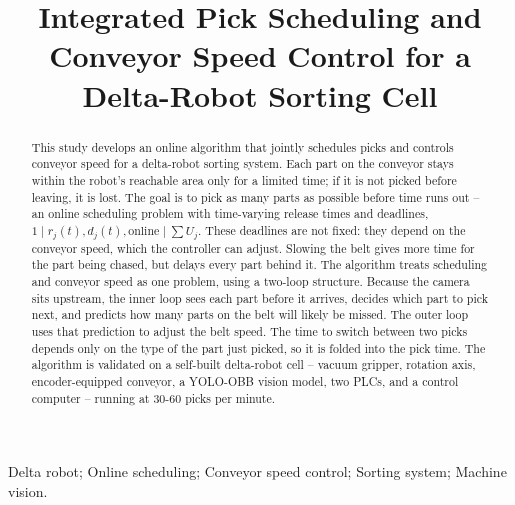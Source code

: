 \documentclass[conference,a4paper]{IEEEtran}
\begin{document}
\title{Integrated Pick Scheduling and Conveyor Speed Control for a
Delta-Robot Sorting Cell}

\author{
}

\maketitle

\begin{abstract}
This study develops an online algorithm that jointly schedules picks and
controls conveyor speed for a delta-robot sorting system. Each part on the
conveyor stays within the robot's reachable area only for a limited time; if
it is not picked before leaving, it is lost. The goal is to pick as many
parts as possible before time runs out -- an online scheduling problem with
time-varying release times and deadlines, $1 \mid r_j(t), d_j(t),
\text{online} \mid \sum U_j$. These deadlines are not fixed: they depend on
the conveyor speed, which the controller can adjust. Slowing the belt gives
more time for the part being chased, but delays every part behind it. The
algorithm treats scheduling and conveyor speed as one problem, using a
two-loop structure. Because the camera sits upstream, the inner loop sees
each part before it arrives, decides which part to pick next, and predicts
how many parts on the belt will likely be missed. The outer loop uses that
prediction to adjust the belt speed. The time to switch between two picks
depends only on the type of the part just picked, so it is folded into the
pick time. The algorithm is validated on a self-built delta-robot cell --
vacuum gripper, rotation axis, encoder-equipped conveyor, a YOLO-OBB vision
model, two PLCs, and a control computer -- running at 30-60 picks per minute.
\end{abstract}

\begin{IEEEkeywords}
Delta robot; Online scheduling; Conveyor speed control; Sorting system;
Machine vision.
\end{IEEEkeywords}
\end{document}
